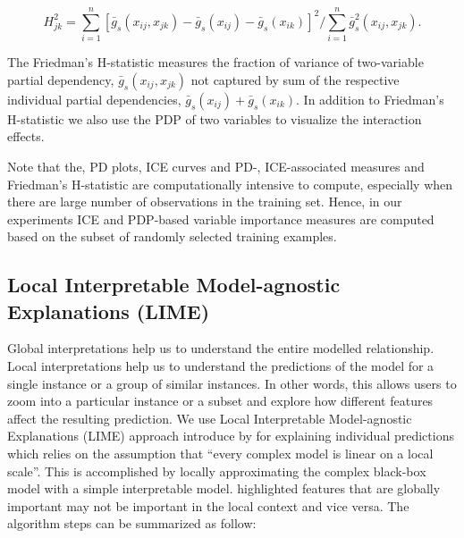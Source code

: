 \documentclass[11pt,a4paper,]{article}
\begin{document}
\[H_{jk}^2=\sum_{i=1}^{n}[\bar{g}_{s}(x_{ij}, x_{jk})-\bar{g}_{s}(x_{ij})-\bar{g}_{s}(x_{ik})]^2/\sum_{i=1}^{n}\bar{g}^2_{s}(x_{ij}, x_{jk}).\]

The Friedman's H-statistic measures the fraction of variance of two-variable partial dependency, \(\bar{g}_{s}(x_{ij}, x_{jk})\) not captured by sum of the respective individual partial dependencies, \(\bar{g}_{s}(x_{ij})+\bar{g}_{s}(x_{ik})\). In addition to Friedman's H-statistic we also use the PDP of two variables to visualize the interaction effects.

Note that the, PD plots, ICE curves and PD-, ICE-associated measures and Friedman's H-statistic are computationally intensive to compute, especially when there are large number of observations in the training set. Hence, in our experiments ICE and PDP-based variable importance measures are computed based on the subset of randomly selected training examples.

\hypertarget{local-interpretable-model-agnostic-explanations-lime}{%
\subsection{Local Interpretable Model-agnostic Explanations (LIME)}\label{local-interpretable-model-agnostic-explanations-lime}}

Global interpretations help us to understand the entire modelled relationship. Local interpretations help us to understand the predictions of the model for a single instance or a group of similar instances. In other words, this allows users to zoom into a particular instance or a subset and explore how different features affect the resulting prediction. We use Local Interpretable Model-agnostic Explanations (LIME) approach introduce by \textcite{ribeiro2016should} for explaining individual predictions which relies on the assumption that ``every complex model is linear on a local scale''. This is accomplished by locally approximating the complex black-box model with a simple interpretable model. \textcite{ribeiro2016should} highlighted features that are globally important may not be important in the local context and vice versa. The algorithm steps can be summarized as follow:
\end{document}
